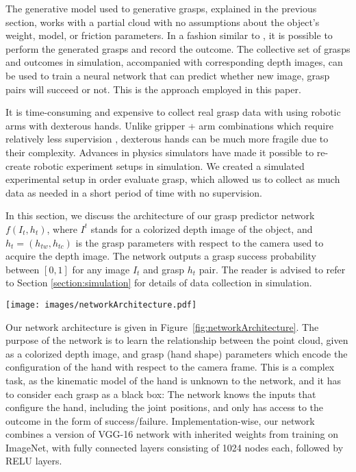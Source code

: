 The generative model used to generative grasps, explained in the previous section, works with a partial cloud with no assumptions about the object's weight, model, or friction parameters. In a fashion similar to \cite{Levine1}, it is possible to perform the generated grasps and record the outcome. The collective set of grasps and outcomes in simulation, accompanied with corresponding depth images, can be used to train a neural network that can predict whether new image, grasp pairs will succeed or not. This is the approach employed in this paper. 

It is time-consuming and expensive to collect real grasp data with using robotic arms with dexterous hands. Unlike gripper + arm combinations which require relatively less supervision \cite{Levine1}, dexterous hands can be much more fragile due to their complexity. Advances in physics simulators have made it possible to re-create robotic experiment setups in simulation. We created a simulated experimental setup in order evaluate grasp, which allowed us to collect as much data as needed in a short period of time with no supervision.

In this section, we discuss the architecture of our grasp predictor network $f(I_t, h_t)$, where $I^t$ stands for a colorized depth image of the object, and $h_t = (h_{tw}, h_{tc})$ is the grasp parameters with respect to the camera used to acquire the depth image. The network outputs a grasp success probability between $[0,1]$ for any image $I_t$ and grasp $h_t$ pair. The reader is advised to refer to Section \ref{section:simulation} for details of data collection in simulation.

\begin{figure*}[ht]
  \texttt{[image: images/networkArchitecture.pdf]}
  \caption{The network architecture for grasp success prediction. First 13 layers of the VGG network has been frozen in order to speed-up the training. Hand shape parameters and visual parameters are added together, and processed through 4 Fully Connected + RELU layer pairs. The outcome of the network is a grasp success probability, obtained from one of the two outputs of the final softmax layer (success and failure probabilities).}
\label{fig:networkArchitecture}
\end{figure*}

Our network architecture is given in Figure~\ref{fig:networkArchitecture}. The purpose of the network is to learn the relationship between the point cloud, given as a colorized depth image, and grasp (hand shape) parameters which encode the configuration of the hand with respect to the camera frame. This is a complex task, as the kinematic model of the hand is unknown to the network, and it has to consider each grasp as a black box: The network knows the inputs that configure the hand, including the joint positions, and only has access to the outcome in the form of success/failure. Implementation-wise, our network combines a version of VGG-16 network with inherited weights from training on ImageNet, with fully connected layers consisting of 1024 nodes each, followed by RELU layers. 

